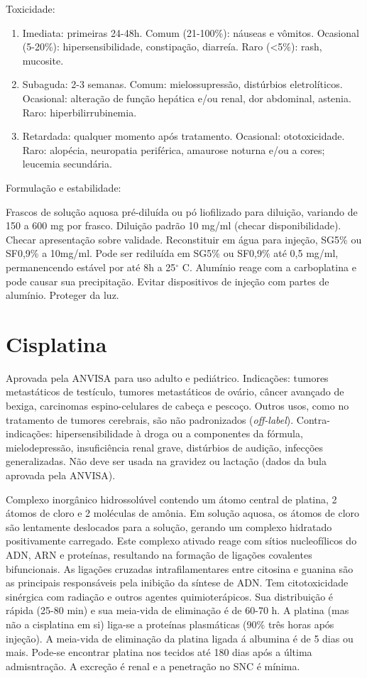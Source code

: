 \documentclass[11pt,a4paper,oldfontcommands]{memoir}
\begin{document}
Toxicidade:
\renewcommand{\labelenumi}{\Alph{enumi}}
\begin{enumerate}
	\item Imediata: primeiras 24-48h. Comum (21-100\%): náuseas e vômitos. Ocasional (5-20\%): hipersensibilidade, constipação, diarreía. Raro (<5\%): rash, mucosite.
	\item Subaguda: 2-3 semanas. Comum: mielossupressão, distúrbios eletrolíticos. Ocasional: alteração de função hepática e/ou renal, dor abdominal, astenia. Raro: hiperbilirrubinemia.
	\item Retardada: qualquer momento após tratamento. Ocasional: ototoxicidade. Raro: alopécia, neuropatia periférica, amaurose noturna e/ou a cores; leucemia secundária.
\end{enumerate}

Formulação e estabilidade: 
		
Frascos de solução aquosa pré-diluída ou pó liofilizado para diluição, variando de 150 a 600 mg por frasco. Diluição padrão 10 mg/ml (checar disponibilidade). Checar apresentação sobre validade. Reconstituir em água para injeção, SG5\% ou SF0,9\% a 10mg/ml. Pode ser rediluída em SG5\% ou SF0,9\% até 0,5 mg/ml, permanencendo estável por até 8h a 25\(^\circ\) C. Alumínio reage com a carboplatina e pode causar sua precipitação. Evitar dispositivos de injeção com partes de alumínio. Proteger da luz.

\section{Cisplatina}

Aprovada pela ANVISA para uso adulto e pediátrico. Indicações: tumores metastáticos de testículo, tumores metastáticos de ovário, câncer avançado de bexiga, carcinomas espino-celulares de cabeça e pescoço. Outros usos, como no tratamento de tumores cerebrais, são não padronizados (\textit{off-label}). Contra-indicações: hipersensibilidade à droga ou a componentes da fórmula, mielodepressão, insuficiência renal grave, distúrbios de audição, infecções generalizadas. Não deve ser usada na gravidez ou lactação (dados da bula aprovada pela ANVISA). 

	Complexo inorgânico hidrossolúvel contendo um átomo central de platina, 2 átomos de cloro e 2 moléculas de amônia. Em solução aquosa, os átomos de cloro são lentamente deslocados para a solução, gerando um complexo hidratado positivamente carregado. Este complexo ativado reage com sítios nucleofílicos do ADN, ARN e proteínas, resultando na formação de ligações covalentes bifuncionais. As ligações cruzadas intrafilamentares entre citosina e guanina são as principais responsáveis pela inibição da síntese de ADN. Tem citotoxicidade sinérgica com radiação e outros agentes quimioterápicos. Sua distribuição é rápida (25-80 min) e sua meia-vida de eliminação é de 60-70 h. A platina (mas não a cisplatina em si) liga-se a proteínas plasmáticas (90\% três horas após injeção). A meia-vida de eliminação da platina ligada á albumina é de 5 dias ou mais. Pode-se encontrar platina nos tecidos até 180 dias após a última admisntração. A excreção é renal e a penetração no SNC é mínima.
\end{document}
